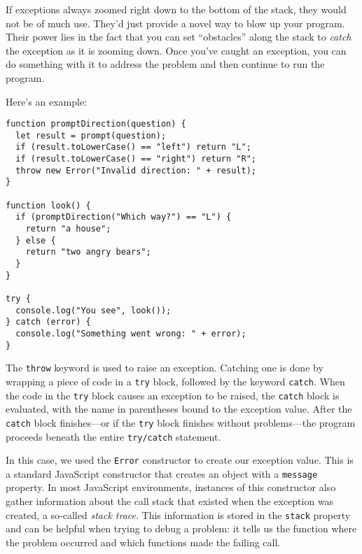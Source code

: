 If exceptions always zoomed right down to the bottom of the stack, they would not be of much use. They'd just provide a novel way to blow up your program. Their power lies in the fact that you can set ``obstacles'' along the stack to \emph{catch} the exception as it is zooming down. Once you've caught an exception, you can do something with it to address the problem and then continue to run the program.

Here's an example:

\label{error.look}\begin{lstlisting}
function promptDirection(question) {
  let result = prompt(question);
  if (result.toLowerCase() == "left") return "L";
  if (result.toLowerCase() == "right") return "R";
  throw new Error("Invalid direction: " + result);
}

function look() {
  if (promptDirection("Which way?") == "L") {
    return "a house";
  } else {
    return "two angry bears";
  }
}

try {
  console.log("You see", look());
} catch (error) {
  console.log("Something went wrong: " + error);
}
\end{lstlisting}
\noindent{}

The \lstinline`throw` keyword is used to raise an exception. Catching one is done by wrapping a piece of code in a \lstinline`try` block, followed by the keyword \lstinline`catch`. When the code in the \lstinline`try` block causes an exception to be raised, the \lstinline`catch` block is evaluated, with the name in parentheses bound to the exception value. After the \lstinline`catch` block finishes—or if the \lstinline`try` block finishes without problems—the program proceeds beneath the entire \lstinline`try/catch` statement.

In this case, we used the \lstinline`Error` constructor to create our exception value. This is a standard JavaScript constructor that creates an object with a \lstinline`message` property. In most JavaScript environments, instances of this constructor also gather information about the call stack that existed when the exception was created, a so-called \emph{stack trace}. This information is stored in the \lstinline`stack` property and can be helpful when trying to debug a problem: it tells us the function where the problem occurred and which functions made the failing call.


